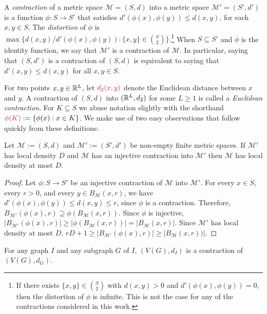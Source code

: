 \documentclass{patmorin}
\makeatletter
\renewcommand{\ge}{\geqslant}
\renewcommand{\le}{\leqslant}
\newcommand{\defin}[1]{\emph{\textcolor{brightmaroon}{#1}}}
\def\mathcolor#1#{\@mathcolor{#1}}
\def\@mathcolor#1#2#3{%
  \protect\leavevmode
  \begingroup
    \color#1{#2}#3%
  \endgroup
}
\newcommand{\mathdefin}[1]{\mathcolor{brightmaroon}{#1}}
\makeatother
\begin{document}
A \defin{contraction} of a metric space $\mathcal{M}=(S,d)$ into a metric space $\mathcal{M'}=(S',d')$ is a function $\phi:S\to S'$ that satisfies $d'(\phi(x),\phi(y))\le d(x,y)$, for each $x,y\in S$. The \defin{distortion} of $\phi$ is $\max\{d(x,y)/d'(\phi(x),\phi(y)):\{x,y\}\in \binom{S}{2}\}$.\footnote{If there exists $\{x,y\}\in \binom{S}{2}$ with $d(x,y)>0$ and $d'(\phi(x),\phi(y))=0$, then the distortion of $\phi$ is infinite. This is not the case for any of the contractions considered in this work.}  When $S\subseteq S'$ and $\phi$ is the identity function, we say that $\mathcal{M'}$ is a contraction of $\mathcal{M}$. In particular, saying that $(S,d')$ is a contraction of $(S,d)$ is equivalent to saying that $d'(x,y)\le d(x,y)$ for all $x,y\in S$.

For two points $x,y\in\mathbb{R}^L$, let $\mathdefin{d_2(x,y)}$ denote the Euclidean distance between $x$ and $y$.  A contraction of $(S,d)$ into $(\mathbb{R}^L, d_2)$ for some $L\ge 1$ is called a \defin{Euclidean contraction}.  For $K\subseteq S$ we abuse notation slightly with the shorthand $\mathdefin{\phi(K)}:=\{\phi(x):x\in K\}$.   We make use of two easy observations that follow quickly from these definitions:

\begin{obs}\label{contraction_increases_density}
  Let $\mathcal{M}:=(S,d)$ and $\mathcal{M}':=(S',d')$ be non-empty finite metric spaces.  If $\mathcal{M'}$ has local density $D$ and $\mathcal{M}$ has an injective contraction into $\mathcal{M}'$ then  $\mathcal{M}$ has local density at most $D$.
\end{obs}

\begin{proof}

  Let $\phi:S\to S'$ be an injective contraction of $\mathcal{M}$ into $\mathcal{M}'$.  For every $x\in S$, every $r > 0$, and every $y\in B_\mathcal{M}(x,r)$, we have $d'(\phi(x),\phi(y))\le d(x,y)\le r$, since $\phi$ is a contraction.  Therefore, $B_{\mathcal{M'}}(\phi(x),r)\supseteq \phi(B_{\mathcal{M}}(x,r))$.  Since $\phi$ is injective, $|B_{\mathcal{M'}}(\phi(x),r)|\ge |\phi(B_{\mathcal{M}}(x,r))|=|B_{\mathcal{M}}(x,r)|$.
  Since $\mathcal{M}'$ has local density at most $D$, $rD+1\ge |B_{\mathcal{M'}}(\phi(x),r)|\ge  |B_{\mathcal{M}}(x,r))|$.
\end{proof}

\begin{obs}\label{supergraph_contraction}
  For any graph $I$ and any subgraph $G$ of $I$, $(V(G),d_I)$ is a contraction of $(V(G),d_G)$.
\end{obs}
\end{document}
